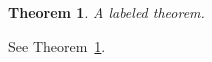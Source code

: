 \documentclass{article}
\begin{document}
\newtheorem{theorem}{Theorem}

\begin{theorem}\label{thm:one}
A labeled theorem.
\end{theorem}

See Theorem~\ref{thm:one}.
\end{document}
